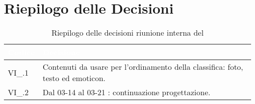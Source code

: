 \section{Riepilogo delle Decisioni}


\begin{table}[!htbp]
    \renewcommand{\arraystretch}{1.5}
    \begin{tabular}{m{}<{\centering}  m{}<{\centering}}
        \rowcolor{darkblue} \textcolor{white}{\textbf{Codice}} & \textcolor{white}{\textbf{Decisione}}                        \\
        \hline
        VI\_{}\D{}.1                                           & Contenuti da usare per l'ordinamento della classifica: foto, testo ed emoticon. \\
        VI\_{}\D{}.2                                           & Dal 03-14 al 03-21 : continuazione progettazione.            \\
    \end{tabular}
    \caption{Riepilogo delle decisioni riunione interna del \D}
\end{table}